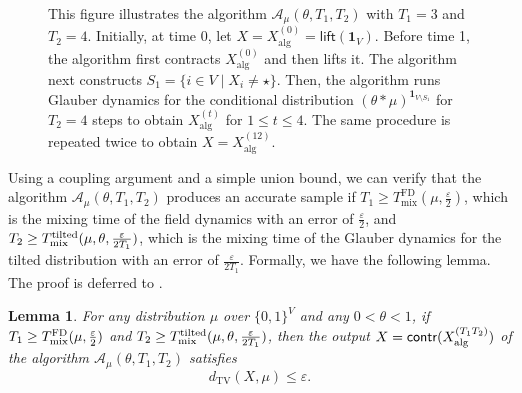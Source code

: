 \documentclass[11pt,a4paper]{article}
\newcommand{\DTV}[2]{d_{\mathrm{TV}}\left({#1},{#2}\right)}
\renewcommand{\epsilon}{\varepsilon}
\newcommand{\mixtl}{T_{\textnormal{mix}}^{\textnormal{tilted}}}
\newcommand{\mixfd}{T_{\textnormal{mix}}^{\textnormal{FD}}}
\newtheorem{lemma}[theorem]{Lemma}
\theoremstyle{definition}
\def\*#1{\mathbf{#1}} %
\def\+#1{\mathcal{#1}} %
\begin{document}
\begin{figure}[ht]
    \caption{This figure illustrates the algorithm \(\+A_{\mu}(\theta,T_1,T_2)\) with \(T_1 = 3\) and \(T_2 = 4\). Initially, at time 0, let $X = X^{(0)}_{\text{alg}} = \textsf{lift}(\*1_V)$. Before time 1, the algorithm first contracts $X^{(0)}_{\text{alg}}$ and then lifts it. The algorithm next constructs $S_1 = \{i\in V \mid X_i \neq \star\}$. Then, the algorithm runs Glauber dynamics for the conditional distribution $(\theta * \mu)^{\*1_{V \setminus {S_1}}}$ for $T_2 = 4$ steps to obtain $X^{(t)}_{\text{alg}}$ for $1\leq t \leq 4$. The same procedure is repeated twice to obtain $X= X^{(12)}_{\text{alg}}$.}
    \label{fig:lifted-simulation-algorithm}
    \end{figure}



Using a coupling argument and a simple union bound, we can verify that the algorithm $\+A_\mu(\theta,T_1,T_2)$ produces an accurate sample if $T_1 \geq T_{\text{mix}}^\text{FD}(\mu,\frac{\epsilon}{2})$, which is the mixing time of the field dynamics with an error of $\frac{\epsilon}{2}$, and $T_2 \geq \mixtl(\mu,\theta,\frac{\epsilon}{2T_1})$, which is the mixing time of the Glauber dynamics for the tilted distribution with an error of $\frac{\epsilon}{2T_1}$.
Formally, we have the following lemma. The proof is deferred to .

\begin{lemma}\label{lem:simu-error}
For any distribution $\mu$ over $\{0,1\}^V$ and any $0< \theta < 1$,  if $T_1 \geq \mixfd(\mu,\frac{\epsilon}{2})$ and $T_2 \geq \mixtl(\mu,\theta,\frac{\epsilon}{2T_1})$, then the output $X = \textsf{contr}(X^{(T_1T_2)}_{\textnormal{alg}})$ of the algorithm $\+A_\mu(\theta,T_1,T_2)$ satisfies
\[\DTV{X}{\mu} \leq \epsilon.\]
\end{lemma}
\end{document}
